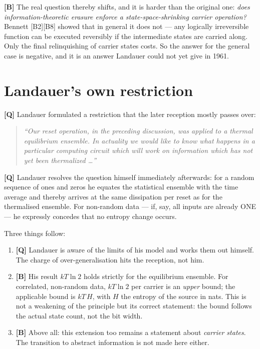 \textbf{[B]} The real question thereby shifts, and it is harder than the original one:
\emph{does information-theoretic erasure enforce a state-space-shrinking carrier
operation?} Bennett [B2][B8] showed that in general it does not --- any logically
irreversible function can be executed reversibly if the intermediate states are
carried along. Only the final relinquishing of carrier states costs. So the answer
for the general case is negative, and it is an answer Landauer could not yet give
in 1961.

\section{Landauer's own restriction}

\textbf{[Q]} Landauer formulated a restriction that the later reception mostly passes over:

\begin{quote}
\itshape
“Our reset operation, in the preceding discussion, was applied to a thermal
equilibrium ensemble. In actuality we would like to know what happens in a
particular computing circuit which will work on information which has not yet been
thermalized \ldots” \upshape [B1]
\end{quote}

\textbf{[Q]} Landauer resolves the question himself immediately afterwards: for a random
sequence of ones and zeros he equates the statistical ensemble with the time
average and thereby arrives at the same dissipation per reset as for the
thermalised ensemble. For non-random data --- if, say, all inputs are already
\textup{ONE} --- he expressly concedes that no entropy change occurs.

Three things follow:

\begin{enumerate}[leftmargin=1.6em,itemsep=0.3em]
  \item \textbf{[Q]} Landauer is aware of the limits of his model and works them out
        himself. The charge of over-generalisation hits the reception, not him.
  \item \textbf{[B]} His result $kT\ln 2$ holds strictly for the equilibrium ensemble. For
        correlated, non-random data, $kT\ln 2$ per carrier is an \emph{upper}
        bound; the applicable bound is $kT\,H$, with $H$ the entropy of the source
        in nats. This is not a weakening of the principle but its correct
        statement: the bound follows the actual state count, not the bit width.
  \item \textbf{[B]} Above all: this extension too remains a statement about
        \emph{carrier states}. The transition to abstract information is not made
        here either.
\end{enumerate}

